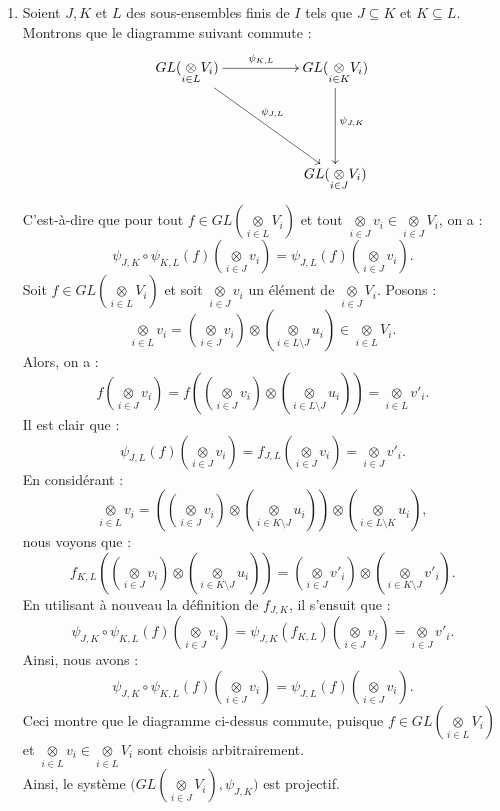 \documentclass[a4paper, 14pt]{report}
\begin{document}
\begin{onehalfspace}
{\begin{enumerate}
				\item Soient $J, K$ et $L$ des sous-ensembles finis de $I$ tels que $J\subseteq K$ et $K\subseteq L$. Montrons que le diagramme suivant commute : 
				$$
				\xymatrix{  GL(\underset{i\in L}\otimes V_i)\ar@{->}[rr]^{\psi_{K,L}}\ar@{->}[rrdd]^{\psi_{J,L}}&& GL(\underset{i\in K}\otimes V_i)\ar@{->}[dd]^{\psi_{J,K}} \\
					&&\\
					& & GL(\underset{i\in J}\otimes V_i)  }
				$$
				C'est-à-dire que pour tout $f\in GL(\underset{i\in L}\otimes V_i)$ et tout $\underset{i\in J}\otimes v_i\in \underset{i\in J}\otimes V_i$, on a :
				$$
				\psi_{J,K}\circ \psi_{K,L}(f)(\underset{i\in J}\otimes v_i)= \psi_{J,L}(f)(\underset{i\in J}\otimes v_i).
				$$
				Soit $f\in GL(\underset{i\in L}\otimes V_i)$ et soit $\underset{i\in J}\otimes v_i$ un élément de $\underset{i\in J}\otimes V_i$. Posons :
				$$
				\underset{i\in L}\otimes v_i = (\underset{i\in J}\otimes v_i)\otimes (\underset{i\in L\setminus J}\otimes u_i)\in \underset{i\in L}\otimes V_i.
				$$
				Alors, on a :
				$$
				f(\underset{i\in J}\otimes v_i)= f((\underset{i\in J}\otimes v_i)\otimes (\underset{i\in L\setminus J}\otimes u_i))= \underset{i\in L}\otimes v'_i.
				$$
				Il est clair que :
				$$
				\psi_{J,L}(f)(\underset{i\in J}\otimes v_i)= f_{J,L}(\underset{i\in J}\otimes v_i)= \underset{i\in J}\otimes v'_i.
				$$
				En considérant :
				$$
				\underset{i\in L}\otimes v_i = ((\underset{i\in J}\otimes v_i)\otimes (\underset{i\in K\setminus J}\otimes u_i))\otimes (\underset{i\in L\setminus K}\otimes u_i),
				$$
				nous voyons que :
				$$
				f_{K,L}((\underset{i\in J}\otimes v_i)\otimes (\underset{i\in K\setminus J}\otimes u_i))= (\underset{i\in J}\otimes v'_i)\otimes (\underset{i\in K\setminus J}\otimes v'_i).
				$$
				En utilisant à nouveau la définition de $f_{J,K}$, il s'ensuit que :
				$$
				\psi_{J,K}\circ \psi_{K,L}(f)(\underset{i\in J}\otimes v_i)= \psi_{J,K}(f_{K,L})(\underset{i\in J}\otimes v_i)= \underset{i\in J}\otimes v'_i.
				$$
				Ainsi, nous avons :
				$$
				\psi_{J,K}\circ \psi_{K,L}(f)(\underset{i\in J}\otimes v_i)= \psi_{J,L}(f)(\underset{i\in J}\otimes v_i).
				$$
				Ceci montre que le diagramme ci-dessus commute, puisque $f\in GL(\underset{i\in L}\otimes V_i)$ et $\underset{i\in L}\otimes v_i\in \underset{i\in L}\otimes V_i$ sont choisis arbitrairement.\\ 
				
				Ainsi, le système $\big(GL(\underset{i\in J}\otimes V_i),\psi_{J,K}\big)$ est projectif.\\ 
				

\end{enumerate}}
\end{onehalfspace}
\end{document}
